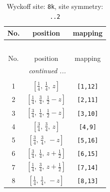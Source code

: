 \documentclass[fleqn,8pt]{jsarticle}
\begin{document}
\begin{longtable}{ccc}
\caption{Wyckoff site: {\tt 8k}, site symmetry: {\tt ..2}}
 \\
 \hline \hline
No. & position & mapping \\ \hline \endfirsthead

\multicolumn{2}{l}{\tablename\ \thetable{}} \\
 \hline \hline
No. & position & mapping \\ \hline \endhead

 \hline \hline
\multicolumn{2}{r}{\footnotesize\it continued ...} \\ \endfoot

 \hline \hline
\multicolumn{2}{r}{} \\ \endlastfoot

1 & $\left[ \frac{1}{4},\, \frac{1}{4},\, z \right]$ & {\tt [1,12]} \\ \hline
2 & $\left[ \frac{1}{4},\, \frac{3}{4},\, \frac{1}{2} - z \right]$ & {\tt [2,11]} \\ \hline
3 & $\left[ \frac{3}{4},\, \frac{1}{4},\, \frac{1}{2} - z \right]$ & {\tt [3,10]} \\ \hline
4 & $\left[ \frac{3}{4},\, \frac{3}{4},\, z \right]$ & {\tt [4,9]} \\ \hline
5 & $\left[ \frac{3}{4},\, \frac{3}{4},\, - z \right]$ & {\tt [5,16]} \\ \hline
6 & $\left[ \frac{3}{4},\, \frac{1}{4},\, z + \frac{1}{2} \right]$ & {\tt [6,15]} \\ \hline
7 & $\left[ \frac{1}{4},\, \frac{3}{4},\, z + \frac{1}{2} \right]$ & {\tt [7,14]} \\ \hline
8 & $\left[ \frac{1}{4},\, \frac{1}{4},\, - z \right]$ & {\tt [8,13]} \\
\end{longtable}
\renewcommand{\arraystretch}{1.2}
\end{document}
